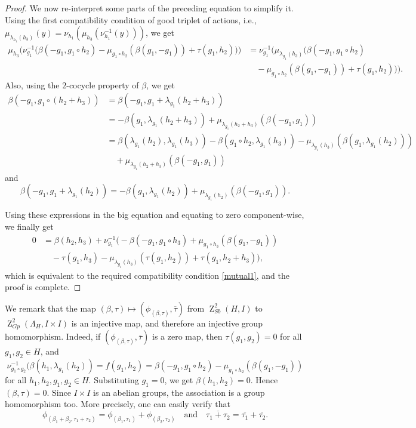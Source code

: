 \documentclass[11pt]{amsart}
\theoremstyle{thrm}
\theoremstyle{plain}
\theoremstyle{definition}
\newcommand{\Z}{\operatorname{Z} }
\numberwithin{equation}{section}
\begin{document}
\begin{proof}
We now re-interpret some parts of the preceding equation to simplify it. Using the first compatibility condition of good triplet of actions, i.e., $\mu_{\lambda_{h_1}(h_3)}(y) = \nu_{h_1} ( \mu_{h_3} ( \nu_{h_1}^{-1}(y) ))
$,  we get
\begin{align*}
\mu_{h_3}\big(\nu^{-1}_{g_1}\big(\beta(-g_1, g_1 \circ h_2) -\mu_{g_1 \circ h_2}(\beta(g_1, -g_1))+ \tau(g_1, h_2)\big) \big) &= \nu^{-1}_{g_1} (\mu_{\lambda_{g_1}(h_3)}(\beta(-g_1, g_1 \circ h_2)\\
&  \quad -\mu_{g_1 \circ h_2}(\beta(g_1, -g_1))+ \tau(g_1, h_2))).
\end{align*}
Also, using the $2$-cocycle property of $\beta$, we get 
\begin{align*}
\beta(-g_1, g_1 \circ(h_2+h_3)) & = \beta(-g_1, g_1 + \lambda_{g_1}(h_2+h_3))\\
& = -\beta(g_1, \lambda_{g_1}(h_2+h_3))+\mu_{\lambda_{g_1}(h_2+h_3)}(\beta(-g_1, g_1))\\
& = \beta(\lambda_{g_1}(h_2), \lambda_{g_1}(h_3))-\beta(g_1 \circ h_2, \lambda_{g_1}(h_3))-\mu_{\lambda_{g_1}(h_3)}(\beta(g_1, \lambda_{g_1}(h_2)))\\
& \quad +\mu_{\lambda_{g_1}(h_2+h_3)}(\beta(-g_1, g_1))
\end{align*}
and 
$$\beta(-g_1, g_1+\lambda_{g_1}(h_2))= -\beta(g_1, \lambda_{g_1}(h_2))+\mu_{\lambda_{g_1}(h_2)}( \beta(-g_1, g_1)).$$

Using these expressions in the big equation and equating to zero component-wise, we finally get 
\begin{align*}
0 &= \beta(h_2, h_3)+ \nu^{-1}_{g_1}\big( -\beta(-g_1, g_1 \circ h_3)+ \mu_{g_1 \circ h_3}(\beta(g_1,-g_1))\\ 
& \quad  -\tau(g_1, h_3)-\mu_{\lambda_{g_1}(h_3)}(\tau(g_1, h_2)) + \tau(g_1, h_2+h_3)\big),
\end{align*}
which is equivalent to the required compatibility condition \eqref{mutual1}, and the proof is complete. 
\end{proof}

We remark that the map $(\beta, \tau) \mapsto (\phi_{(\beta, \tau)}, \overline{\tau})$ from $\Z^2_{Sb}(H,I)$ to 
$\Z^2_{Gp}(\Lambda_H,I \times I)$ is an injective map, and therefore an injective group homomorphism. Indeed, if  $(\phi_{(\beta, \tau)}, \overline{\tau})$ is a zero map, then $\tau(g_1, g_2) = 0$ for all $g_1, g_2 \in H$, and 
$$ \nu^{-1}_{g_1 \circ g_2} \big( \beta(h_1, \lambda_{g_1}(h_2)) = f(g_1, h_2) =  \beta(-g_1, g_1 \circ h_2) -\mu_{g_1 \circ h_2}(\beta(g_1, -g_1))$$
for all $h_1, h_2, g_1, g_2 \in H$. Substituting $g_1 = 0$, we get $\beta(h_1, h_2) = 0$. Hence $(\beta, \tau) = 0$. Since $I \times I$ is an abelian groups, the association is a group homomorphism too. More precisely, one can  easily  verify that
	\[
	\phi_{(\beta_1 + \beta_2, \tau_1 + \tau_2)} = \phi_{(\beta_1, \tau_1)} + \phi_{(\beta_2, \tau_2)}
	\quad \text{and} \quad 
	\overline{\tau_1 + \tau_2} = \overline{\tau_1} + \overline{\tau_2}.
	\]
\end{document}

